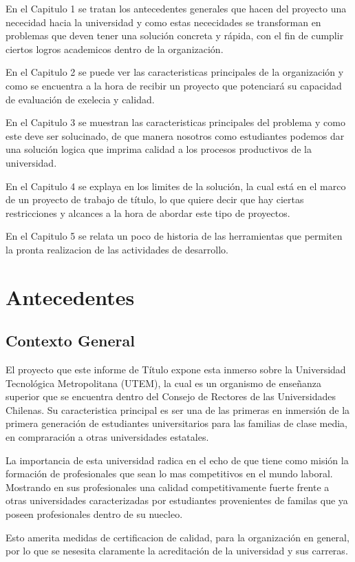 \documentclass[a4paper,12pt,openany,oneside]{book}
\begin{document}
En el Capitulo 1 se tratan los antecedentes generales que hacen del proyecto una nececidad hacia la universidad y como estas nececidades se transforman en problemas que deven tener una solución concreta y rápida, con el fin de cumplir ciertos logros academicos dentro de la organización.

En el Capitulo 2 se puede ver las caracteristicas principales de la organización y como se encuentra a la hora de recibir un proyecto que potenciará su capacidad de evaluación de exelecia y calidad.

En el Capitulo 3 se muestran las caracteristicas principales del problema y como este deve ser solucinado, de que manera nosotros como estudiantes podemos dar una solución logica que imprima calidad a los procesos productivos de la universidad.

En el Capitulo 4 se explaya en los limites de la solución, la cual está en el marco de un proyecto de trabajo de título, lo que quiere decir que hay ciertas restricciones y alcances a la hora de abordar este tipo de proyectos.

En el Capitulo 5 se relata un poco de historia de las herramientas que permiten la pronta realizacion de las actividades de desarrollo. 
\chapter{Antecedentes}
\thispagestyle{empty}
\section{Contexto General}
El proyecto que este informe de Título expone esta inmerso sobre la Universidad Tecnológica Metropolitana (UTEM), la cual es un organismo de enseñanza superior que se encuentra dentro del Consejo de Rectores de las Universidades Chilenas. Su caracteristica principal es ser una de las primeras en inmersión de la primera generación de estudiantes universitarios para las familias de clase media, en compraración a otras universidades estatales.

La importancia de esta universidad radica en el echo de que tiene como misión la formación de profesionales que sean lo mas competitivos en el mundo laboral. Mostrando en sus profesionales una calidad competitivamente fuerte frente a otras universidades caracterizadas por estudiantes provenientes de familas que ya poseen profesionales dentro de su nuecleo.

Esto amerita medidas de certificacion de calidad, para la organización en general, por lo que se nesesita claramente la acreditación de la universidad y sus carreras.
\end{document}
